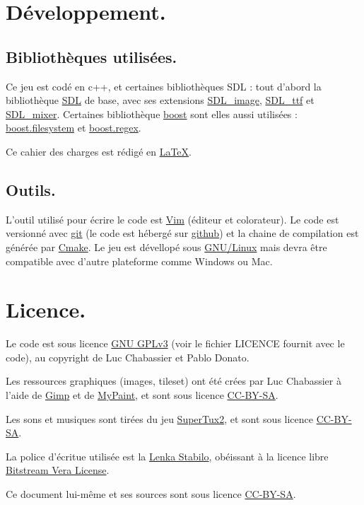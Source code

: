 \documentclass{article}
\begin{document}
\section{Développement.}
\subsection{Bibliothèques utilisées.}
Ce jeu est codé en c++, et certaines bibliothèques SDL : tout d'abord la bibliothèque \href{http://www.libsdl.org/}{SDL} de base, avec ses extensions \href{http://www.libsdl.org/projects/SDL\_image/}{SDL\_image}, \href{http://www.libsdl.org/projects/SDL\_ttf/}{SDL\_ttf} et \href{http://www.libsdl.org/projects/SDL\_mixer/}{SDL\_mixer}. Certaines bibliothèque \href{http://www.boost.org/}{boost} sont elles aussi utilisées : \href{http://www.boost.org/doc/libs/1\_39\_0/libs/filesystem/doc/index.htm}{boost.filesystem} et \href{http://www.boost.org/doc/libs/1\_53\_0/libs/regex/doc/html/index.html}{boost.regex}.

Ce cahier des charges est rédigé en \href{http://www.latex-project.org/}{\LaTeX}.

\subsection{Outils.}
L'outil utilisé pour écrire le code est \href{http://www.vim.org/}{Vim} (éditeur et colorateur). Le code est versionné avec \href{http://git-scm.com/}{git} (le code est hébergé sur \href{https://github.com/Lycee/ISN\_snake}{github}) et la chaine de compilation est générée par \href{http://www.cmake.org/}{Cmake}. Le jeu est dévellopé sous \href{https://en.wikipedia.org/wiki/Linux}{GNU/Linux} mais devra être compatible avec d'autre plateforme comme Windows ou Mac.

\section{Licence.}
Le code est sous licence \href{http://gplv3.fsf.org/}{GNU GPLv3} (voir le fichier LICENCE fournit avec le code), au copyright de Luc Chabassier et Pablo Donato.

Les ressources graphiques (images, tileset) ont été crées par Luc Chabassier à l'aide de \href{http://www.gimp.org/}{Gimp} et de \href{http://mypaint.intilinux.com/}{MyPaint}, et sont sous licence \href{https://creativecommons.org/licenses/by-sa/2.0/}{CC-BY-SA}.

Les sons et musiques sont tirées du jeu \href{http://supertux.lethargik.org/}{SuperTux2}, et sont sous licence \href{https://creativecommons.org/licenses/by-sa/2.0/}{CC-BY-SA}.

La police d'écritue utilisée est la \href{http://openfontlibrary.org/en/font/lenka-stabilo}{Lenka Stabilo}, obéissant à la licence libre \href{http://www-old.gnome.org/fonts/}{Bitstream Vera License}.

Ce document lui-même et ses sources sont sous licence \href{https://creativecommons.org/licenses/by-sa/2.0/}{CC-BY-SA}.
\end{document}

